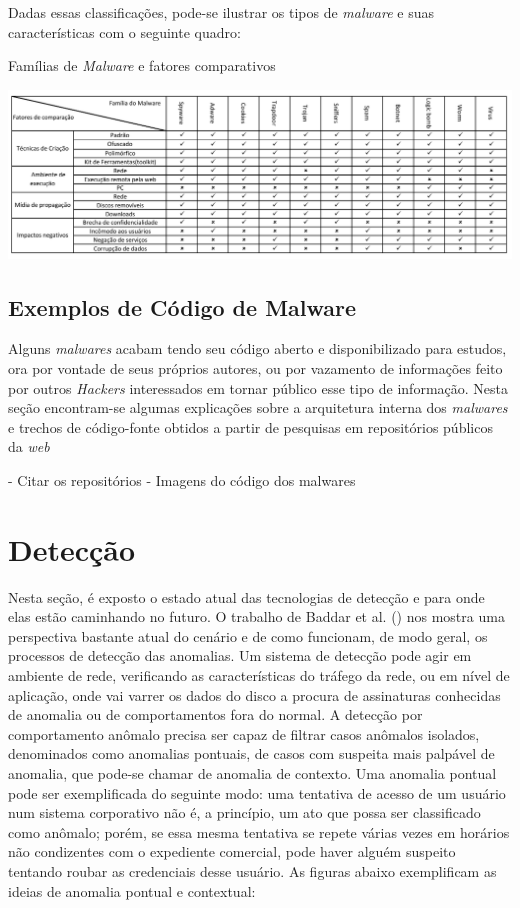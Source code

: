 Dadas essas classificações, pode-se ilustrar os tipos de \textit{malware} e suas características com o seguinte quadro:

\begin{quadro}[h]
\caption{\small Famílias de \textit{Malware} e fatores comparativos}
\centering
\includegraphics{figs/tabela.pdf}
\label{f.tabelamalware}
\end{quadro}
\subsection{Exemplos de Código de Malware} %
\label{ssub:exemplos_malware}

Alguns \textit{malwares} acabam tendo seu código aberto e disponibilizado para estudos, ora por vontade de seus próprios autores, ou por vazamento de informações feito por outros \textit{Hackers} interessados em tornar público esse tipo de informação. Nesta seção encontram-se algumas explicações sobre a arquitetura interna dos \textit{malwares} e trechos de código-fonte obtidos a partir de pesquisas em repositórios públicos da \textit{web} 

- Citar os repositórios
- Imagens do código dos malwares



\section{Detecção}
\label{s.deteccao}

Nesta seção, é exposto o estado atual das tecnologias de
detecção e para onde elas estão caminhando no futuro. O trabalho de
Baddar et al. (\citeyear{baddarxx}) nos mostra uma perspectiva bastante atual do cenário e
de como funcionam, de modo geral, os processos de detecção das anomalias. Um
sistema de detecção pode agir em ambiente de rede, verificando as
características do tráfego da rede, ou em nível de aplicação, onde vai varrer
os dados do disco a procura de assinaturas conhecidas de anomalia ou de
comportamentos fora do normal. A detecção por comportamento anômalo precisa
ser capaz de filtrar casos anômalos isolados, denominados como anomalias
pontuais, de casos com suspeita mais palpável de anomalia, que pode-se chamar de
anomalia de contexto. Uma anomalia pontual pode ser exemplificada do seguinte
modo: uma tentativa de acesso de um usuário num sistema corporativo não é, a
princípio, um ato que possa ser classificado como anômalo; porém, se essa
mesma tentativa se repete várias vezes em horários não condizentes com o
expediente comercial, pode haver alguém suspeito tentando roubar as
credenciais desse usuário. As figuras abaixo exemplificam as ideias de
anomalia pontual e contextual:

